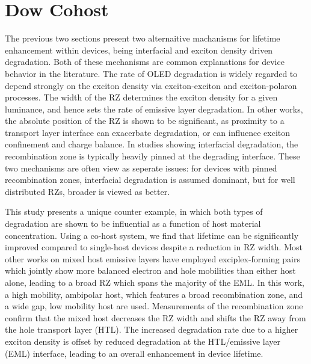 \documentclass[../thesis.tex]{subfiles}
\begin{document}
\newpage
\section{Dow Cohost}\label{sec:lifetime_dow}

The previous two sections present two alternaitive machanisms for lifetime enhancement within devices, being interfacial and exciton density driven degradation.
Both of these mechanisms are common explanations for device behavior in the literature.
The rate of OLED degradation is widely regarded to depend strongly on the exciton density via exciton-exciton and exciton-polaron processes.\supercite{Scholz2015,Schmidbauer2013a,Giebink2008a,Bangsund2018,Liu2004,So2010} 
The width of the RZ determines the exciton density for a given luminance, and hence sets the rate of emissive layer degradation.\supercite{Bangsund2018,Zhang2014,Chwang2002,Wu2016} 
In other works, the absolute position of the RZ is shown to be significant, as proximity to a transport layer interface can exacerbate degradation,\supercite{Hershey2017,Wang2013,Jeon2015} or can influence exciton confinement and charge balance.\supercite{Coburn2017,Coburn2016a} 
In studies showing interfacial degradation, the recombination zone is typically heavily pinned at the degrading interface. 
These two mechanisms are often view as seperate issues: for devices with pinned recombination zones, interfacial degradation is assumed dominant, but for well distributed RZs, broader is viewed as better.

This study presents a unique counter example, in which both types of degradation are shown to be influential as a function of host material concentration.
Using a co-host system, we find that lifetime can be significantly improved compared to single-host devices despite a reduction in RZ width. 
Most other works on mixed host emissive layers have employed exciplex-forming pairs which jointly show more balanced electron and hole mobilities than either host alone, leading to a broad RZ which spans the majority of the EML.\supercite{Kim2017,Kim2017,Chwang2002,Erickson2011,Song2017}
In this work, a high mobility, ambipolar host, which features a broad recombination zone, and a wide gap, low mobility host are used. 
Measurements of the recombination zone confirm that the mixed host decreases the RZ width and shifts the RZ away from the hole transport layer (HTL). 
The increased degradation rate due to a higher exciton density is offset by reduced degradation at the HTL/emissive layer (EML) interface, leading to an overall enhancement in device lifetime. 
\end{document}
